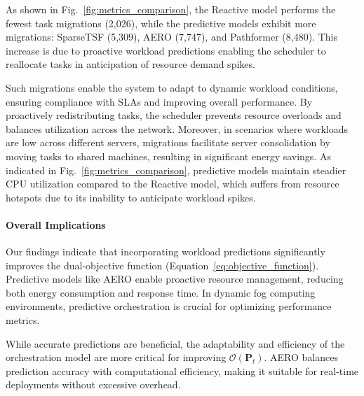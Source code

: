 \documentclass{ieeetmlcn}
\begin{document}
As shown in Fig.~\ref{fig:metrics_comparison}, the Reactive model performs the fewest task migrations (2,026), while the predictive models exhibit more migrations: SparseTSF (5,309), AERO (7,747), and Pathformer (8,480). This increase is due to proactive workload predictions enabling the scheduler to reallocate tasks in anticipation of resource demand spikes.

Such migrations enable the system to adapt to dynamic workload conditions, ensuring compliance with SLAs and improving overall performance. By proactively redistributing tasks, the scheduler prevents resource overloads and balances utilization across the network. Moreover, in scenarios where workloads are low across different servers, migrations facilitate server consolidation by moving tasks to shared machines, resulting in significant energy savings. As indicated in Fig.~\ref{fig:metrics_comparison}, predictive models maintain steadier CPU utilization compared to the Reactive model, which suffers from resource hotspots due to its inability to anticipate workload spikes.


\paragraph*{Overall Implications}

Our findings indicate that incorporating workload predictions significantly improves the dual-objective function (Equation~\eqref{eq:objective_function}). Predictive models like AERO enable proactive resource management, reducing both energy consumption and response time. In dynamic fog computing environments, predictive orchestration is crucial for optimizing performance metrics.

While accurate predictions are beneficial, the adaptability and efficiency of the orchestration model are more critical for improving $\mathcal{O}(\mathbf{P}_t)$. AERO balances prediction accuracy with computational efficiency, making it suitable for real-time deployments without excessive overhead.
\end{document}
